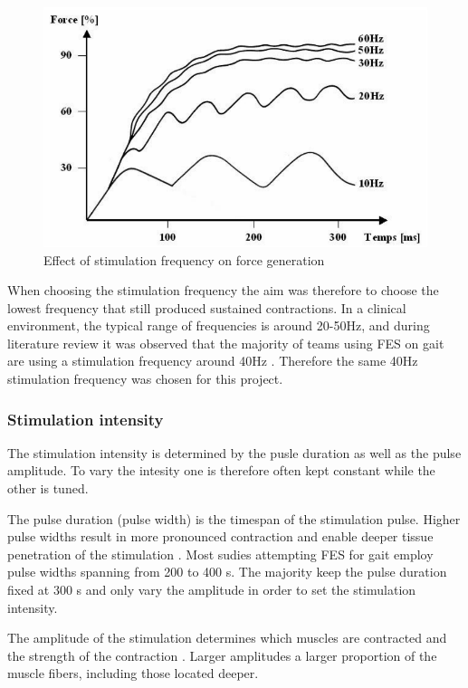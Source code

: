 \begin{figure} [H]
    \centering
    \includegraphics[width=0.7\linewidth]{images/stimfreq.png}
    \caption{Effect of stimulation frequency on force generation \cite{metrailler_systeme_2005}}
    \label{fig:stimfreq}
\end{figure}

When choosing the stimulation frequency the aim was therefore to choose the lowest frequency that still produced sustained contractions. In a clinical environment, the typical range of frequencies is around 20-50Hz, and during literature review it was observed that the majority of teams using FES on gait are using a stimulation frequency around 40Hz \cite{aout_effects_2023}. Therefore the same 40Hz stimulation frequency was chosen for this project.



\subsubsection{Stimulation intensity }
The stimulation intensity is determined by the pusle duration as well as the pulse amplitude. To vary the intesity one is therefore often kept constant while the other is tuned. 

The pulse duration (pulse width) is the timespan of the stimulation pulse. Higher pulse widths result in more pronounced contraction and enable deeper tissue penetration of the stimulation . Most sudies attempting FES for gait employ pulse widths spanning from 200 to 400 \micro s. The majority keep the pulse duration fixed at 300 \micro s and only vary the amplitude in order to set the stimulation intensity.\cite{aout_effects_2023}

The amplitude of the stimulation determines which muscles are contracted and the strength of the contraction \cite{marquez-chin_functional_2020}. Larger amplitudes a larger proportion of the muscle fibers, including those located deeper. 

